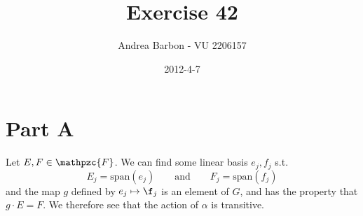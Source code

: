 \documentclass[]{article}
\title{Exercise 42}
\author{ Andrea Barbon - VU 2206157 }
\date{2012-4-7}
\newcommand{\AND}{\qquad \text{and} \qquad}
\begin{document}
\ifpdf
{}
\else
{}
\fi

\maketitle

\section{Part A}
Let $E,F \in \mathpzc{F} $. We can find some linear basis $e_j,f_j$ s.t. 
$$ E_j = \text{span}(e_j) \AND F_j = \text{span}(f_j) $$
and the map $ g $ defined by $e_j \mapsto \f_j$ is an element of $G$, and has the property that $ g\cdot E=F $. We therefore see that the action of $\alpha$ is transitive.
\end{document}
